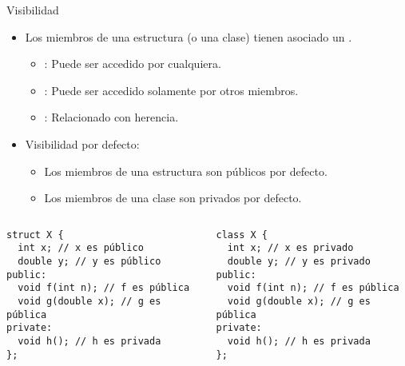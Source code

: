 

\begin{frame}[t,fragile]{Visibilidad}
\begin{itemize}
  \item Los miembros de una estructura (o una clase) tienen asociado 
        un .
    \begin{itemize}
      \item {}: Puede ser accedido por cualquiera.
      \item {}: Puede ser accedido solamente por otros miembros.
      \item {}: Relacionado con herencia.
    \end{itemize}
  \item Visibilidad por defecto:
    \begin{itemize}
      \item Los miembros de una estructura son públicos por defecto.
      \item Los miembros de una clase son privados por defecto.
    \end{itemize}
\end{itemize}


\begin{columns}


\begin{lstlisting}
struct X {
  int x; // x es público
  double y; // y es público
public:
  void f(int n); // f es pública
  void g(double x); // g es pública
private:
  void h(); // h es privada
};
\end{lstlisting}


\begin{lstlisting}
class X {
  int x; // x es privado
  double y; // y es privado
public:
  void f(int n); // f es pública
  void g(double x); // g es pública
private:
  void h(); // h es privada
};
\end{lstlisting}

\end{columns}

\end{frame}

